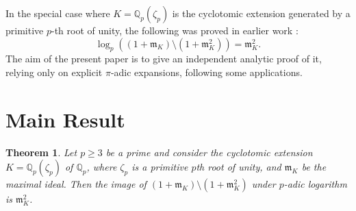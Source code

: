 \documentclass[12pt,reqno]{amsart}
\numberwithin{figure}{section}
\theoremstyle{plain}
\newtheorem{thm}{Theorem}[section]
\theoremstyle{definition}
\numberwithin{equation}{section}
\begin{document}
In the special case where $K=\mathbb{Q}_p(\zeta_p)$ is the cyclotomic extension generated by a primitive $p$-th root of unity, the following was proved in earlier work \cite{MAS}:
\[\log_p\left((1+\mathfrak{m}_K) \setminus (1+\mathfrak{m}_K^2) \right)=\mathfrak{m}_K^2.\]
The aim of the present paper is to give an independent analytic proof of it, relying only on explicit $\pi$-adic expansions, following some applications.



\section{Main Result}
\begin{thm}\label{t2.1}
Let $p \geq 3 $ be a prime and consider the cyclotomic extension $K=\mathbb{Q}_p(\zeta_p)$ of $\mathbb{Q}_p$, where $\zeta_p$ is a primitive $p$th root of unity, and $\mathfrak{m}_K$ be the maximal ideal. Then the image of $(1+\mathfrak{m}_K) \setminus (1+\mathfrak{m}_K^2)$ under $p$-adic logarithm is $\mathfrak{m}_K^2$.
\end{thm}
\end{document}
